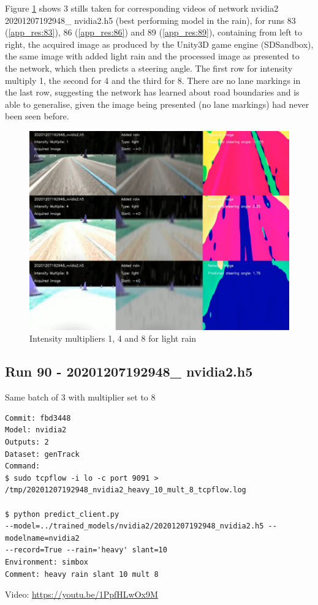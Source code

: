 Figure \ref{fig:20201207192948_nvidia2_mult_1_4_8_light} shows 3 stills taken for corresponding videos of network nvidia2 20201207192948\_ nvidia2.h5 (best performing model in the rain), for runs 83 (\ref{app_res:83}), 86 (\ref{app_res:86}) and 89 (\ref{app_res:89}), containing from left to right, the acquired image as produced by the Unity3D game engine (SDSandbox), the same image with added light rain and the processed image as presented to the network, which then predicts a steering angle. The first row for intensity multiply 1, the second for 4 and the third for 8. There are no lane markings in the last row, suggesting the network has learned about road boundaries and is able to generalise, given the image being presented (no lane markings) had never been seen before.

\begin{figure}[ht]
 \centering 
 \includegraphics[width=\textwidth]{Figures/20201207192948_nvidia2_mult_1_4_8_light.png}
 \caption{Intensity multipliers 1, 4 and 8 for light rain}
 \label{fig:20201207192948_nvidia2_mult_1_4_8_light}
\end{figure}

\subsection{Run 90 - 20201207192948\_ nvidia2.h5 }
Same batch of 3 with multiplier set to 8
\label{app_res:90}
\begin{verbatim}
Commit: fbd3448
Model: nvidia2 
Outputs: 2
Dataset: genTrack
Command:
$ sudo tcpflow -i lo -c port 9091 > 
/tmp/20201207192948_nvidia2_heavy_10_mult_8_tcpflow.log

$ python predict_client.py
--model=../trained_models/nvidia2/20201207192948_nvidia2.h5 --modelname=nvidia2 
--record=True --rain='heavy' slant=10
Environment: simbox
Comment: heavy rain slant 10 mult 8
\end{verbatim}
Video: \url{https://youtu.be/1PpfHLwOx9M}

